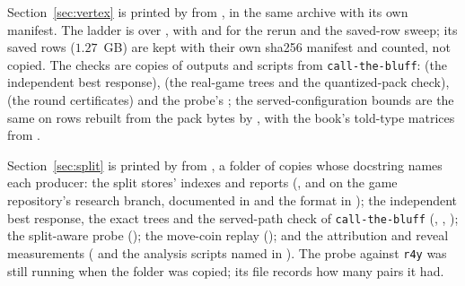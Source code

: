 \documentclass[11pt]{article}
\theoremstyle{plain}
\theoremstyle{definition}
\theoremstyle{remark}
\newcommand{\code}[1]{\texttt{\small #1}}
\begin{document}
Section~\ref{sec:vertex} is printed by
 from
, in the same archive with its own
manifest. The ladder is 
over , with 
and  for the rerun and the saved-row
sweep; its saved rows ($1.27$~GB) are kept with their own sha256
manifest and counted, not copied. The checks are copies of outputs and
scripts from \code{call-the-bluff}: 
(the independent best response), 
(the real-game trees and the quantized-pack check),
 (the round certificates) and the
probe's ; the served-configuration bounds are the
same  on rows rebuilt from the pack bytes by
, with the book's told-type matrices from
.

Section~\ref{sec:split} is printed by
 from
, a folder of copies whose
docstring names each producer: the split stores' indexes and
 reports (,
 and  on the game
repository's research branch, documented in
 and the format in
); the independent best response, the exact
trees and the served-path check of \code{call-the-bluff}
(, ,
); the split-aware probe
(); the move-coin replay
(); and the attribution and reveal measurements
( and the analysis scripts named in
). The probe against \code{r4y} was
still running when the folder was copied; its file records how many
pairs it had.
\end{document}
